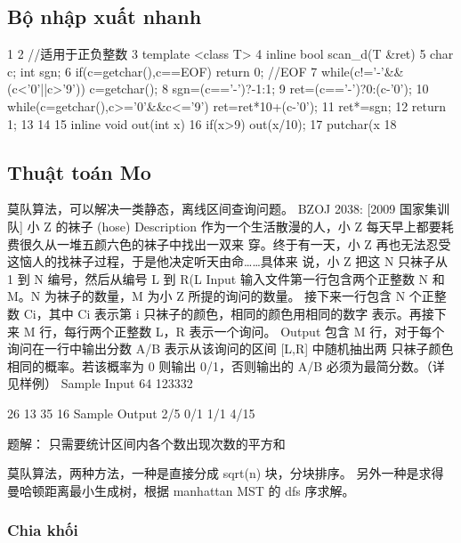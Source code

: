 \documentclass[11pt]{article}
\begin{document}
\subsection{Bộ nhập xuất nhanh}

\begin{Code}
 1
 2   //适用于正负整数
 3   template <class T>
 4   inline bool scan_d(T &ret) {
 5      char c; int sgn;
 6      if(c=getchar(),c==EOF) return 0; //EOF
 7      while(c!='-'&&(c<'0'||c>'9')) c=getchar();
 8      sgn=(c=='-')?-1:1;
 9      ret=(c=='-')?0:(c-'0');
10      while(c=getchar(),c>='0'&&c<='9') ret=ret*10+(c-'0');
11      ret*=sgn;
12      return 1;
13   }
14
15   inline void out(int x) {
16      if(x>9) out(x/10);
17      putchar(x%
18   }
\end{Code}

\subsection{Thuật toán Mo}

\begin{Code}
     莫队算法，可以解决一类静态，离线区间查询问题。
     BZOJ 2038: [2009 国家集训队] 小 Z 的袜子 (hose)
     Description
     作为一个生活散漫的人，小 Z 每天早上都要耗费很久从一堆五颜六色的袜子中找出一双来
     穿。终于有一天，小 Z 再也无法忍受这恼人的找袜子过程，于是他决定听天由命……具体来
     说，小 Z 把这 N 只袜子从 1 到 N 编号，然后从编号 L 到 R(L
     Input
     输入文件第一行包含两个正整数 N 和 M。N 为袜子的数量，M 为小 Z 所提的询问的数量。
     接下来一行包含 N 个正整数 Ci，其中 Ci 表示第 i 只袜子的颜色，相同的颜色用相同的数字
     表示。再接下来 M 行，每行两个正整数 L，R 表示一个询问。
     Output
     包含 M 行，对于每个询问在一行中输出分数 A/B 表示从该询问的区间 [L,R] 中随机抽出两
     只袜子颜色相同的概率。若该概率为 0 则输出 0/1，否则输出的 A/B 必须为最简分数。（详
     见样例）
     Sample Input
     64
     123332


     26
     13
     35
     16
     Sample Output
     2/5
     0/1
     1/1
     4/15

     题解：
     只需要统计区间内各个数出现次数的平方和

     莫队算法，两种方法，一种是直接分成 sqrt(n) 块，分块排序。
     另外一种是求得曼哈顿距离最小生成树，根据 manhattan MST 的 dfs 序求解。
\end{Code}

\subsubsection{Chia khối}
\end{document}
